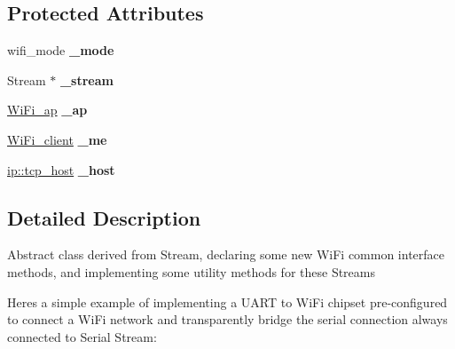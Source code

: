 \subsection*{Protected Attributes}
\begin{DoxyCompactItemize}
\item 
\mbox{\label{classwood_box_1_1communication_1_1wifi_1_1_a_wi_fi_communicator_ac07f090eb75730353a78f2d26f2095f1}} 
wifi\+\_\+mode {\bfseries \+\_\+mode}
\item 
\mbox{\label{classwood_box_1_1communication_1_1wifi_1_1_a_wi_fi_communicator_a297970584d8120015f898afa1278eb46}} 
Stream $\ast$ {\bfseries \+\_\+stream}
\item 
\mbox{\label{classwood_box_1_1communication_1_1wifi_1_1_a_wi_fi_communicator_a9d2cdaede0b5e5040867c3d428dd98f0}} 
\mbox{\hyperlink{structwood_box_1_1communication_1_1wifi_1_1s__wifi__access__point}{Wi\+Fi\+\_\+ap}} {\bfseries \+\_\+ap}
\item 
\mbox{\label{classwood_box_1_1communication_1_1wifi_1_1_a_wi_fi_communicator_afde4ef66d5296fbeeff2e1b333105bec}} 
\mbox{\hyperlink{structwood_box_1_1communication_1_1wifi_1_1s__wifi__client}{Wi\+Fi\+\_\+client}} {\bfseries \+\_\+me}
\item 
\mbox{\label{classwood_box_1_1communication_1_1wifi_1_1_a_wi_fi_communicator_ace744bc5d2c8f66dcd735029b129dea6}} 
\mbox{\hyperlink{structwood_box_1_1communication_1_1ip_1_1s__host}{ip\+::tcp\+\_\+host}} {\bfseries \+\_\+host}
\end{DoxyCompactItemize}


\subsection{Detailed Description}
Abstract class derived from Stream, declaring some new Wi\+Fi common interface methods, and implementing some utility methods for these {\ttfamily Stream}s

Here\textquotesingle{}s a simple example of implementing a U\+A\+RT to Wi\+Fi chipset pre-\/configured to connect a Wi\+Fi network and transparently bridge the serial connection always connected to Serial Stream\+:


